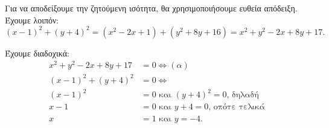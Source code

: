 
\begin{alist}
\item Για να αποδείξουμε την ζητούμενη ισότητα, θα χρησιμοποιήσουμε ευθεία απόδειξη.
Έχουμε λοιπόν:
\[(x - 1)^2 + (y + 4)^2 = (x^2 - 2x + 1) + (y^2 + 8y + 16) = x^2 + y^2 - 2x + 8y + 17.\]

\item Έχουμε διαδοχικά:
\begin{align*}
x^2 + y^2 - 2x + 8y + 17 &= 0 \Leftrightarrow (\alpha) \\
(x - 1)^2 + (y + 4)^2 &= 0 \Leftrightarrow \\
(x - 1)^2 &= 0 \text{ και } (y + 4)^2 = 0\text{, δηλαδή} \\
x - 1 &= 0 \text{ και } y + 4 = 0\text{, οπότε τελικά} \\
x &= 1 \text{ και } y = -4.
\end{align*}
\end{alist}

